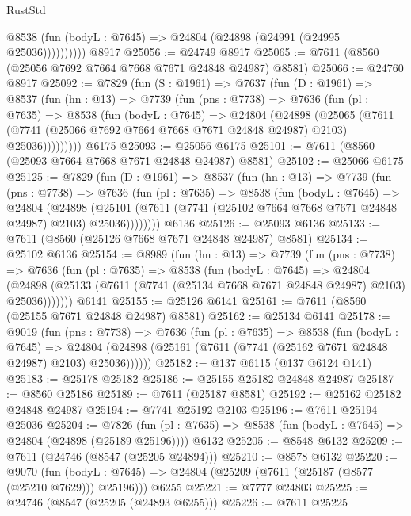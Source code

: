 \begin{lexlean}{RustStd}
\begin{coremodule}
              @8538 (fun (bodyL : @7645) => @24804 (@24898 (@24991 (@24995 @25036))))))))))
    @8917
@25056 := @24749 @8917
@25065 := @7611 (@8560 (@25056 @7692 @7664 @7668 @7671 @24848 @24987) @8581)
@25066 := @24760 @8917
@25092 := @7829
    (fun (S : @1961) =>
    @7637
      (fun (D : @1961) =>
      @8537
        (fun (hn : @13) =>
        @7739
          (fun (pns : @7738) =>
          @7636
            (fun (pl : @7635) =>
            @8538
              (fun (bodyL : @7645) =>
              @24804
                (@24898
                  (@25065
                    (@7611
                      (@7741 (@25066 @7692 @7664 @7668 @7671 @24848 @24987) @2103)
                      @25036)))))))))
    @6175
@25093 := @25056 @6175
@25101 := @7611 (@8560 (@25093 @7664 @7668 @7671 @24848 @24987) @8581)
@25102 := @25066 @6175
@25125 := @7829
    (fun (D : @1961) =>
    @8537
      (fun (hn : @13) =>
      @7739
        (fun (pns : @7738) =>
        @7636
          (fun (pl : @7635) =>
          @8538
            (fun (bodyL : @7645) =>
            @24804
              (@24898
                (@25101 (@7611 (@7741 (@25102 @7664 @7668 @7671 @24848 @24987) @2103) @25036))))))))
    @6136
@25126 := @25093 @6136
@25133 := @7611 (@8560 (@25126 @7668 @7671 @24848 @24987) @8581)
@25134 := @25102 @6136
@25154 := @8989
    (fun (hn : @13) =>
    @7739
      (fun (pns : @7738) =>
      @7636
        (fun (pl : @7635) =>
        @8538
          (fun (bodyL : @7645) =>
          @24804
            (@24898 (@25133 (@7611 (@7741 (@25134 @7668 @7671 @24848 @24987) @2103) @25036)))))))
    @6141
@25155 := @25126 @6141
@25161 := @7611 (@8560 (@25155 @7671 @24848 @24987) @8581)
@25162 := @25134 @6141
@25178 := @9019
    (fun (pns : @7738) =>
    @7636
      (fun (pl : @7635) =>
      @8538
        (fun (bodyL : @7645) =>
        @24804 (@24898 (@25161 (@7611 (@7741 (@25162 @7671 @24848 @24987) @2103) @25036))))))
@25182 := @137 @6115 (@137 @6124 @141)
@25183 := @25178 @25182
@25186 := @25155 @25182 @24848 @24987
@25187 := @8560 @25186
@25189 := @7611 (@25187 @8581)
@25192 := @25162 @25182 @24848 @24987
@25194 := @7741 @25192 @2103
@25196 := @7611 @25194 @25036
@25204 := @7826
    (fun (pl : @7635) => @8538 (fun (bodyL : @7645) => @24804 (@24898 (@25189 @25196))))
    @6132
@25205 := @8548 @6132
@25209 := @7611 (@24746 (@8547 (@25205 @24894)))
@25210 := @8578 @6132
@25220 := @9070
    (fun (bodyL : @7645) => @24804 (@25209 (@7611 (@25187 (@8577 (@25210 @7629))) @25196)))
    @6255
@25221 := @7777 @24803
@25225 := @24746 (@8547 (@25205 (@24893 @6255)))
@25226 := @7611 @25225

\end{coremodule}
\end{lexlean}
